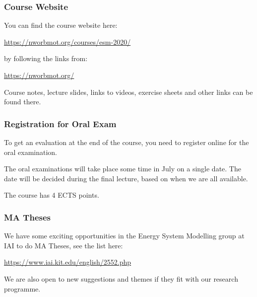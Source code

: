 \documentclass[10pt,aspectratio=169,dvipsnames]{beamer}
\begin{document}
\begin{frame}
  \frametitle{Course Website}

  You can find the course website here:

  \url{https://nworbmot.org/courses/esm-2020/}

  by following the links from:

  \url{https://nworbmot.org/}

  Course notes, lecture slides, links to videos, exercise sheets and other links can be found there.

\end{frame}


\begin{frame}
  \frametitle{Registration for Oral Exam}

  To get an evaluation at the end of the course, you need to register
  online for the oral examination.

  The oral examinations will take place some time in July on a
  single date. The date will be decided during the final lecture,
  based on when we are all available.

  \vspace{.2cm}

  The course has 4 ECTS points.

\end{frame}


\begin{frame}
  \frametitle{MA Theses}

  We have some exciting opportunities in the Energy System Modelling
  group at IAI to do MA Theses, see the list here:

  \url{https://www.iai.kit.edu/english/2552.php}

  We are also open to new suggestions and themes if they fit with our
  research programme.

\end{frame}
\end{document}
